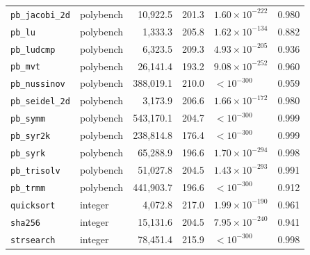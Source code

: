 {\begin{longtable}{llrrp{2.0cm}r}
\texttt{pb\_jacobi\_2d} & polybench & 10,922.5 & 201.3 & $1.60\times10^{-222}$ & 0.980 \\
\texttt{pb\_lu} & polybench & 1,333.3 & 205.8 & $1.62\times10^{-134}$ & 0.882 \\
\texttt{pb\_ludcmp} & polybench & 6,323.5 & 209.3 & $4.93\times10^{-205}$ & 0.936 \\
\texttt{pb\_mvt} & polybench & 26,141.4 & 193.2 & $9.08\times10^{-252}$ & 0.960 \\
\texttt{pb\_nussinov} & polybench & 388,019.1 & 210.0 & $<10^{-300}$ & 0.959 \\
\texttt{pb\_seidel\_2d} & polybench & 3,173.9 & 206.6 & $1.66\times10^{-172}$ & 0.980 \\
\texttt{pb\_symm} & polybench & 543,170.1 & 204.7 & $<10^{-300}$ & 0.999 \\
\texttt{pb\_syr2k} & polybench & 238,814.8 & 176.4 & $<10^{-300}$ & 0.999 \\
\texttt{pb\_syrk} & polybench & 65,288.9 & 196.6 & $1.70\times10^{-294}$ & 0.998 \\
\texttt{pb\_trisolv} & polybench & 51,027.8 & 204.5 & $1.43\times10^{-293}$ & 0.991 \\
\texttt{pb\_trmm} & polybench & 441,903.7 & 196.6 & $<10^{-300}$ & 0.912 \\
\texttt{quicksort} & integer & 4,072.8 & 217.0 & $1.99\times10^{-190}$ & 0.961 \\
\texttt{sha256} & integer & 15,131.6 & 204.5 & $7.95\times10^{-240}$ & 0.941 \\
\texttt{strsearch} & integer & 78,451.4 & 215.9 & $<10^{-300}$ & 0.998 \\
\end{longtable}
}
